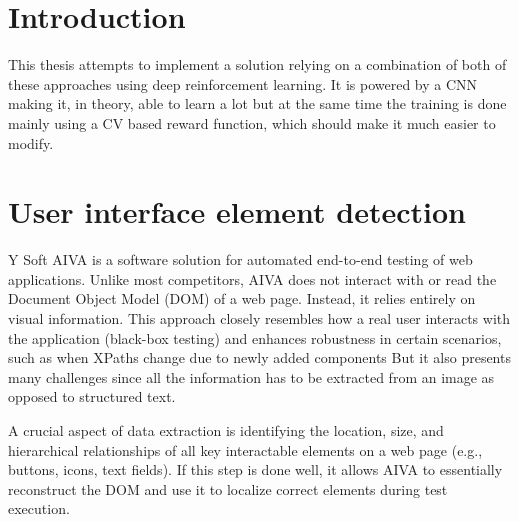 \documentclass[
  digital,     %
  oneside,     %
  nosansbold,  %
  nocolorbold, %
  lof,         %
  lot,         %
]{fithesis4}
\begin{document}
\chapter*{Introduction}

This thesis attempts to implement a solution relying on a combination of both of these approaches using deep reinforcement learning. It is powered by a CNN making it, in theory, able to learn a lot but at the same time the training is done mainly using a CV based reward function, which should make it much easier to modify.

\chapter{User interface element detection}

Y Soft AIVA is a software solution for automated end-to-end testing of web applications. Unlike most competitors, AIVA does not interact with or read the Document Object Model (DOM) of a web page. Instead, it relies entirely on visual information. This approach closely resembles how a real user interacts with the application (black-box testing) and enhances robustness in certain scenarios, such as when XPaths change due to newly added components But it also presents many challenges since all the information has to be extracted from an image as opposed to structured text.

A crucial aspect of data extraction is identifying the location, size, and hierarchical relationships of all key interactable elements on a web page (e.g., buttons, icons, text fields). If this step is done well, it allows AIVA to essentially reconstruct the DOM and use it to localize correct elements during test execution.
\end{document}

